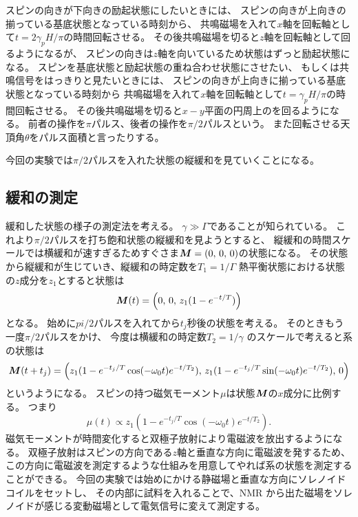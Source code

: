 \documentclass[11pt,dvipdfmx,a4paper]{jsarticle}
\begin{document}
スピンの向きが下向きの励起状態にしたいときには、
スピンの向きが上向きの揃っている基底状態となっている時刻から、
共鳴磁場を入れて\(x\)軸を回転軸として\(t=2\gamma_pH/\pi\)の時間回転させる。
その後共鳴磁場を切ると\(z\)軸を回転軸として回るようになるが、
スピンの向きは\(z\)軸を向いているため状態はずっと励起状態になる。
スピンを基底状態と励起状態の重ね合わせ状態にさせたい、
もしくは共鳴信号をはっきりと見たいときには、
スピンの向きが上向きに揃っている基底状態となっている時刻から
共鳴磁場を入れて\(x\)軸を回転軸として\(t=\gamma_pH/\pi\)の時間回転させる。
その後共鳴磁場を切ると\(x-y\)平面の円周上のを回るようになる。
前者の操作を\(\pi\)パルス、後者の操作を\(\pi/2\)パルスという。
また回転させる天頂角\(\theta\)をパルス面積と言ったりする。

今回の実験では\(\pi/2\)パルスを入れた状態の縦緩和を見ていくことになる。

\subsection{緩和の測定}
緩和した状態の様子の測定法を考える。
\(\gamma\gg\Gamma\)であることが知られている。
これより\(\pi/2\)パルスを打ち飽和状態の縦緩和を見ようとすると、
縦緩和の時間スケールでは横緩和が速すぎるためすぐさま\(\vb*{M}=(0,\,0,\,0)\)の状態になる。
その状態から縦緩和が生じていき、縦緩和の時定数を\(T_1 = 1/\Gamma\)
熱平衡状態における状態の\(z\)成分を\(z_1\)とすると状態は
\begin{equation}
	\vb*{M}(t) = \qty(0,\,0,\,z_1(1-e^{-t/T}))
\end{equation}
となる。
始めに\(pi/2\)パルスを入れてから\(t_j\)秒後の状態を考える。
そのときもう一度\(\pi/2\)パルスをかけ、
今度は横緩和の時定数\(T_2=1/\gamma\) のスケールで考えると系の状態は
\begin{equation}
	\vb*{M}(t+t_j) = \qty(z_1(1-e^{-t_j/T}\cos(-\omega_0 t)e^{-t/T_2}),\,
	z_1(1-e^{-t_j/T}\sin(-\omega_0 t)e^{-t/T_2}),\,0)
\end{equation}
というようになる。
スピンの持つ磁気モーメント\(\mu\)は状態\(\vb*{M}\)の\(x\)成分に比例する。
つまり
\begin{equation}
	\mu(t) \propto z_1(1-e^{-t_j/T}\cos(-\omega_0 t)e^{-t/T_2}).
\end{equation}
磁気モーメントが時間変化すると双極子放射により電磁波を放出するようになる。
双極子放射はスピンの方向である\(z\)軸と垂直な方向に電磁波を発するため、
この方向に電磁波を測定するような仕組みを用意してやれば系の状態を測定することができる。
今回の実験では始めにかける静磁場と垂直な方向にソレノイドコイルをセットし、
その内部に試料を入れることで、NMR から出た磁場をソレノイドが感じる変動磁場として電気信号に変えて測定する。
\end{document}
